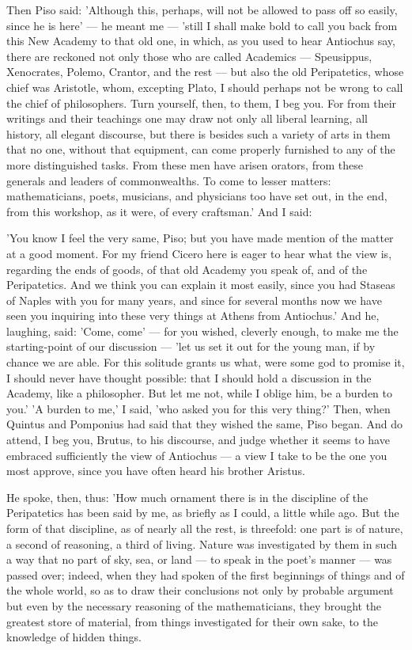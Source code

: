  Then Piso said: 'Although this, perhaps, will not be allowed to pass off so easily, since he is here' — he meant me — 'still I shall make bold to call you back from this New Academy to that old one, in which, as you used to hear Antiochus say, there are reckoned not only those who are called Academics — Speusippus, Xenocrates, Polemo, Crantor, and the rest — but also the old Peripatetics, whose chief was Aristotle, whom, excepting Plato, I should perhaps not be wrong to call the chief of philosophers. Turn yourself, then, to them, I beg you. For from their writings and their teachings one may draw not only all liberal learning, all history, all elegant discourse, but there is besides such a variety of arts in them that no one, without that equipment, can come properly furnished to any of the more distinguished tasks. From these men have arisen orators, from these generals and leaders of commonwealths. To come to lesser matters: mathematicians, poets, musicians, and physicians too have set out, in the end, from this workshop, as it were, of every craftsman.' And I said:

 'You know I feel the very same, Piso; but you have made mention of the matter at a good moment. For my friend Cicero here is eager to hear what the view is, regarding the ends of goods, of that old Academy you speak of, and of the Peripatetics. And we think you can explain it most easily, since you had Staseas of Naples with you for many years, and since for several months now we have seen you inquiring into these very things at Athens from Antiochus.' And he, laughing, said: 'Come, come' — for you wished, cleverly enough, to make me the starting-point of our discussion — 'let us set it out for the young man, if by chance we are able. For this solitude grants us what, were some god to promise it, I should never have thought possible: that I should hold a discussion in the Academy, like a philosopher. But let me not, while I oblige him, be a burden to you.' 'A burden to me,' I said, 'who asked you for this very thing?' Then, when Quintus and Pomponius had said that they wished the same, Piso began. And do attend, I beg you, Brutus, to his discourse, and judge whether it seems to have embraced sufficiently the view of Antiochus — a view I take to be the one you most approve, since you have often heard his brother Aristus.

 He spoke, then, thus: 'How much ornament there is in the discipline of the Peripatetics has been said by me, as briefly as I could, a little while ago. But the form of that discipline, as of nearly all the rest, is threefold: one part is of nature, a second of reasoning, a third of living. Nature was investigated by them in such a way that no part of sky, sea, or land — to speak in the poet's manner — was passed over; indeed, when they had spoken of the first beginnings of things and of the whole world, so as to draw their conclusions not only by probable argument but even by the necessary reasoning of the mathematicians, they brought the greatest store of material, from things investigated for their own sake, to the knowledge of hidden things.

